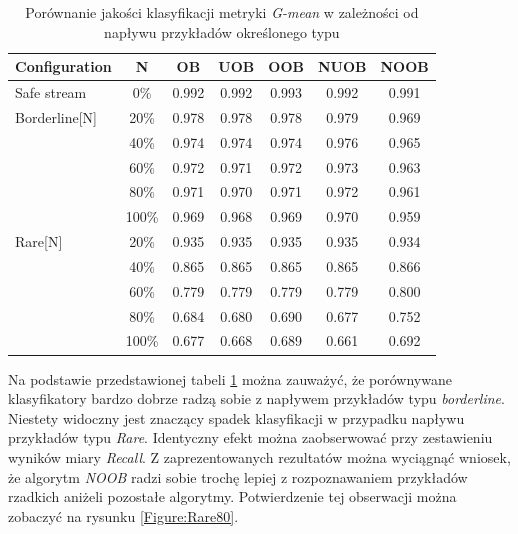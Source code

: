 \begin{table}[ht]
\centering\small%
\renewcommand{\arraystretch}{1.5} 
\begin{tabular}{l c c c c c c}
\toprule
Configuration & N & OB & UOB & OOB & NUOB & NOOB \\
\midrule
Safe stream & 0\% & 0.992 & 0.992 & 0.993 & 0.992 & 0.991 \\
Borderline[N] & 20\% & 0.978 & 0.978 & 0.978 & 0.979 & 0.969 \\
& 40\% & 0.974 & 0.974 & 0.974 & 0.976 & 0.965 \\
& 60\% & 0.972 & 0.971 & 0.972 & 0.973 & 0.963 \\
& 80\% & 0.971 & 0.970 & 0.971 & 0.972 & 0.961 \\
& 100\% & 0.969 & 0.968 & 0.969 & 0.970 & 0.959 \\
Rare[N] & 20\% & 0.935 & 0.935 & 0.935 & 0.935 & 0.934 \\
& 40\% & 0.865 & 0.865 & 0.865 & 0.865 & 0.866 \\
& 60\% & 0.779 & 0.779 & 0.779 & 0.779 & 0.800 \\
& 80\% & 0.684 & 0.680 & 0.690 & 0.677 & 0.752 \\
& 100\% & 0.677 & 0.668 & 0.689 & 0.661 & 0.692 \\
\bottomrule
\end{tabular}
\caption{Porównanie jakości klasyfikacji metryki \textit{G-mean} w zależności od napływu przykładów określonego typu}\label{Tab:BorderlineRare}
\end{table}

\noindent Na podstawie przedstawionej tabeli \ref{Tab:BorderlineRare} można zauważyć, że porównywane klasyfikatory bardzo dobrze radzą sobie z napływem przykładów typu \textit{borderline}. Niestety widoczny jest znaczący spadek klasyfikacji w przypadku napływu przykładów typu \textit{Rare}. Identyczny efekt można zaobserwować przy zestawieniu wyników miary \textit{Recall}. Z zaprezentowanych rezultatów można wyciągnąć wniosek, że algorytm \textit{NOOB} radzi sobie trochę lepiej z rozpoznawaniem przykładów rzadkich aniżeli pozostałe algorytmy. Potwierdzenie tej obserwacji można zobaczyć na rysunku \ref{Figure:Rare80}.

\newpage


